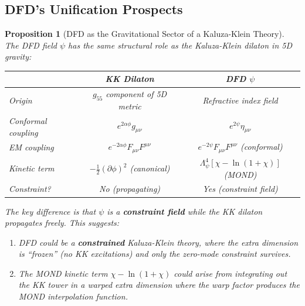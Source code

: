 \documentclass[11pt,a4paper]{article}
\newtheorem{proposition}{Proposition}
\begin{document}
\subsection{DFD's Unification Prospects}

\begin{proposition}[DFD as the Gravitational Sector of a Kaluza-Klein Theory]
\label{prop:KK-embedding}
The DFD field $\psi$ has the same structural role as the Kaluza-Klein dilaton in 5D gravity:
\begin{center}
\begin{tabular}{lcc}
\toprule
& \textbf{KK Dilaton} & \textbf{DFD $\psi$} \\
\midrule
Origin & $g_{55}$ component of 5D metric & Refractive index field \\
Conformal coupling & $e^{2\alpha\phi}g_{\mu\nu}$ & $e^{2\psi}\eta_{\mu\nu}$ \\
EM coupling & $e^{-2\alpha\phi}F_{\mu\nu}F^{\mu\nu}$ & $e^{-2\psi}F_{\mu\nu}F^{\mu\nu}$ (conformal) \\
Kinetic term & $-\frac{1}{2}(\partial\phi)^2$ (canonical) & $\Lambda_\psi^4[\chi-\ln(1+\chi)]$ (MOND) \\
Constraint? & No (propagating) & Yes (constraint field) \\
\bottomrule
\end{tabular}
\end{center}

The key difference is that $\psi$ is a \textbf{constraint field} while the KK dilaton propagates freely. This suggests:
\begin{enumerate}
\item DFD could be a \textbf{constrained} Kaluza-Klein theory, where the extra dimension is ``frozen'' (no KK excitations) and only the zero-mode constraint survives.
\item The MOND kinetic term $\chi - \ln(1+\chi)$ could arise from integrating out the KK tower in a warped extra dimension where the warp factor produces the MOND interpolation function.
\end{enumerate}
\end{proposition}
\end{document}
